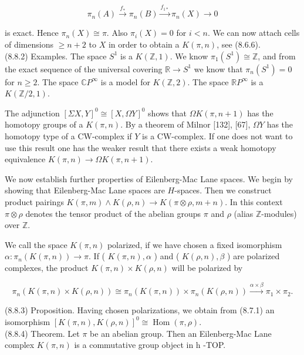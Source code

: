 \documentclass[10pt, letterpaper]{article}
\begin{document}
$$
\pi_{n}(A) \xrightarrow{f_{*}} \pi_{n}(B) \xrightarrow{f_{1 *}} \pi_{n}(X) \longrightarrow 0
$$

is exact. Hence $\pi_{n}(X) \cong \pi$. Also $\pi_{i}(X)=0$ for $i<n$. We can now attach cells of dimensions $\geq n+2$ to $X$ in order to obtain a $K(\pi, n)$, see (8.6.6).\\
(8.8.2) Examples. The space $S^{1}$ is a $K(\mathbb{Z}, 1)$. We know $\pi_{1}\left(S^{1}\right) \cong \mathbb{Z}$, and from the exact sequence of the universal covering $\mathbb{R} \rightarrow S^{1}$ we know that $\pi_{n}\left(S^{1}\right)=0$ for $n \geq 2$. The space $\mathbb{C} P^{\infty}$ is a model for $K(\mathbb{Z}, 2)$. The space $\mathbb{R} P^{\infty}$ is a $K(\mathbb{Z} / 2,1)$.

The adjunction $[\Sigma X, Y]^{0} \cong[X, \Omega Y]^{0}$ shows that $\Omega K(\pi, n+1)$ has the homotopy groups of a $K(\pi, n)$. By a theorem of Milnor [132], [67], $\Omega Y$ has the homotopy type of a CW-complex if $Y$ is a CW-complex. If one does not want to use this result one has the weaker result that there exists a weak homotopy equivalence $K(\pi, n) \rightarrow \Omega K(\pi, n+1)$.

We now establish further properties of Eilenberg-Mac Lane spaces. We begin by showing that Eilenberg-Mac Lane spaces are $H$-spaces. Then we construct product pairings $K(\pi, m) \wedge K(\rho, n) \rightarrow K(\pi \otimes \rho, m+n)$. In this context $\pi \otimes \rho$ denotes the tensor product of the abelian groups $\pi$ and $\rho$ (alias $\mathbb{Z}$-modules) over $\mathbb{Z}$.

We call the space $K(\pi, n)$ polarized, if we have chosen a fixed isomorphism $\alpha: \pi_{n}(K(\pi, n)) \rightarrow \pi$. If ( $K(\pi, n), \alpha$ ) and ( $K(\rho, n), \beta$ ) are polarized complexes, the product $K(\pi, n) \times K(\rho, n)$ will be polarized by

$$
\pi_{n}(K(\pi, n) \times K(\rho, n)) \cong \pi_{n}(K(\pi, n)) \times \pi_{n}(K(\rho, n)) \xrightarrow{\alpha \times \beta} \pi_{1} \times \pi_{2} .
$$

(8.8.3) Proposition. Having chosen polarizations, we obtain from (8.7.1) an isomorphism $[K(\pi, n), K(\rho, n)]^{0} \cong \operatorname{Hom}(\pi, \rho)$.\\
(8.8.4) Theorem. Let $\pi$ be an abelian group. Then an Eilenberg-Mac Lane complex $K(\pi, n)$ is a commutative group object in h -TOP.
\end{document}

